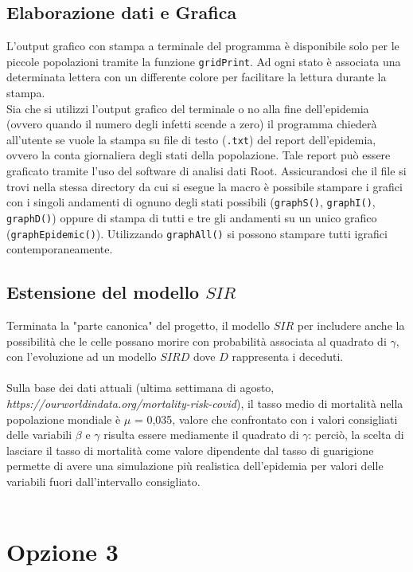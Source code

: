 \documentclass[a4paper]{article}
\begin{document}
\subsection{Elaborazione dati e Grafica}
L'output grafico con stampa a terminale del programma è disponibile solo per le piccole popolazioni tramite la funzione \texttt{gridPrint}. Ad ogni stato è associata una determinata lettera con un differente colore per facilitare la lettura durante la stampa. \\
Sia che si utilizzi l'output grafico del terminale o no alla fine dell'epidemia (ovvero quando il numero degli infetti scende a zero) il programma chiederà all'utente se vuole la stampa su file di testo (\texttt{.txt}) del report dell'epidemia, ovvero la conta giornaliera degli stati della popolazione. Tale report può essere graficato tramite l'uso del software di analisi dati Root. Assicurandosi che il file si trovi nella stessa directory da cui si esegue la macro è possibile stampare i grafici con i singoli andamenti di ognuno degli stati possibili (\texttt{graphS()}, \texttt{graphI()}, \texttt{graphD()}) oppure di stampa di tutti e tre gli andamenti su un unico grafico (\texttt{graphEpidemic()}). Utilizzando \texttt{graphAll()} si possono stampare tutti igrafici contemporaneamente.
\subsection{Estensione del modello $SIR$}
Terminata la "parte canonica" del progetto, il modello $SIR$ per includere anche la possibilità che le celle possano morire con probabilità associata al quadrato di $\gamma$, con l'evoluzione ad un modello $SIRD$ dove $D$ rappresenta i deceduti.\\ \\ Sulla base dei dati attuali (ultima settimana di agosto,\\ \textit{https://ourworldindata.org/mortality-risk-covid}), il tasso medio di mortalità nella popolazione mondiale è $\mu$ = 0,035, valore che confrontato con i valori consigliati delle variabili $\beta$ e $\gamma$ risulta essere mediamente il quadrato di $\gamma$: perciò, la scelta  di lasciare il tasso di mortalità come valore dipendente dal tasso di guarigione permette di avere una simulazione più realistica dell'epidemia per valori delle variabili fuori dall'intervallo consigliato. 
\\ \\


\section{Opzione 3}
\end{document}
